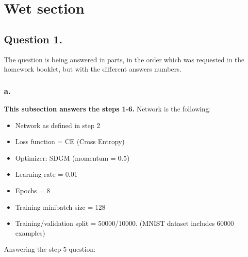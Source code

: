 \documentclass[a4paper]{iacas}
\begin{document}
\newpage



\section{Wet section}

\subsection{Question 1.}
The question is being answered in parts, in the order which was requested in the homework booklet, but with the different answers numbers.

\subsubsection{\textbf{a.}}
\textbf{This subsection answers the steps 1-6. }
\newline
Network is the following:
\begin{itemize}
\item Network as defined in step 2
\item Loss function = CE (Cross Entropy)
\item Optimizer: SDGM (momentum = 0.5)
\item Learning rate = 0.01
\item Epochs = 8
\item Training minibatch size = 128
\item Training/validation split = 50000/10000.  (MNIST dataset includes 60000 examples)
\end{itemize}

Answering the step 5 question:
\end{document}
